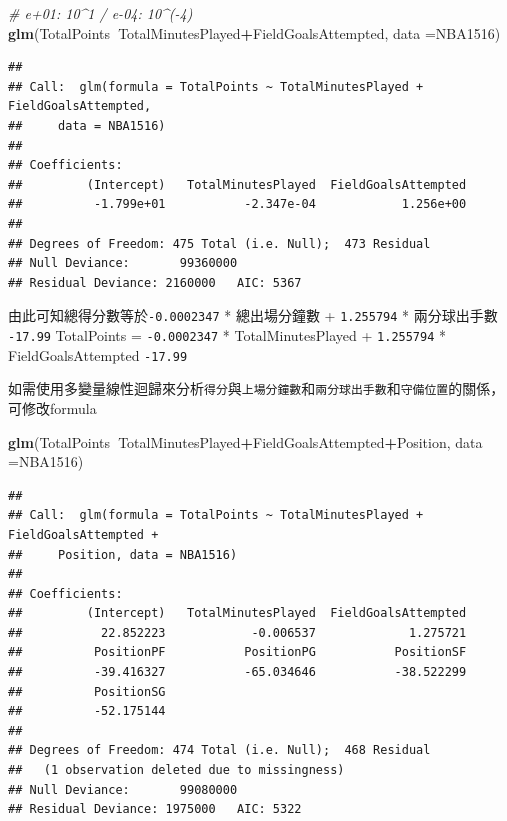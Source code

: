 \documentclass[
]{book}
\newenvironment{Shaded}{\begin{snugshade}}{\end{snugshade}}
\newcommand{\CommentTok}[1]{\textcolor[rgb]{0.56,0.35,0.01}{\textit{#1}}}
\newcommand{\DataTypeTok}[1]{\textcolor[rgb]{0.13,0.29,0.53}{#1}}
\newcommand{\KeywordTok}[1]{\textcolor[rgb]{0.13,0.29,0.53}{\textbf{#1}}}
\newcommand{\NormalTok}[1]{#1}
\newcommand{\OperatorTok}[1]{\textcolor[rgb]{0.81,0.36,0.00}{\textbf{#1}}}
\begin{document}
\begin{Shaded}
\begin{Highlighting}[]
\CommentTok{# e+01: 10^1 / e-04: 10^(-4)}
\KeywordTok{glm}\NormalTok{(TotalPoints}\OperatorTok{~}\NormalTok{TotalMinutesPlayed}\OperatorTok{+}\NormalTok{FieldGoalsAttempted,}
    \DataTypeTok{data =}\NormalTok{NBA1516)}
\end{Highlighting}
\end{Shaded}

\begin{verbatim}
## 
## Call:  glm(formula = TotalPoints ~ TotalMinutesPlayed + FieldGoalsAttempted, 
##     data = NBA1516)
## 
## Coefficients:
##         (Intercept)   TotalMinutesPlayed  FieldGoalsAttempted  
##          -1.799e+01           -2.347e-04            1.256e+00  
## 
## Degrees of Freedom: 475 Total (i.e. Null);  473 Residual
## Null Deviance:	    99360000 
## Residual Deviance: 2160000 	AIC: 5367
\end{verbatim}

由此可知總得分數等於\texttt{-0.0002347} * 總出場分鐘數 + \texttt{1.255794} * 兩分球出手數 \texttt{-17.99}
TotalPoints = \texttt{-0.0002347} * TotalMinutesPlayed + \texttt{1.255794} * FieldGoalsAttempted \texttt{-17.99}

如需使用多變量線性迴歸來分析\texttt{得分}與\texttt{上場分鐘數}和\texttt{兩分球出手數}和\texttt{守備位置}的關係，可修改formula

\begin{Shaded}
\begin{Highlighting}[]
\KeywordTok{glm}\NormalTok{(TotalPoints}\OperatorTok{~}\NormalTok{TotalMinutesPlayed}\OperatorTok{+}\NormalTok{FieldGoalsAttempted}\OperatorTok{+}\NormalTok{Position,}
    \DataTypeTok{data =}\NormalTok{NBA1516)}
\end{Highlighting}
\end{Shaded}

\begin{verbatim}
## 
## Call:  glm(formula = TotalPoints ~ TotalMinutesPlayed + FieldGoalsAttempted + 
##     Position, data = NBA1516)
## 
## Coefficients:
##         (Intercept)   TotalMinutesPlayed  FieldGoalsAttempted  
##           22.852223            -0.006537             1.275721  
##          PositionPF           PositionPG           PositionSF  
##          -39.416327           -65.034646           -38.522299  
##          PositionSG  
##          -52.175144  
## 
## Degrees of Freedom: 474 Total (i.e. Null);  468 Residual
##   (1 observation deleted due to missingness)
## Null Deviance:	    99080000 
## Residual Deviance: 1975000 	AIC: 5322
\end{verbatim}
\end{document}
